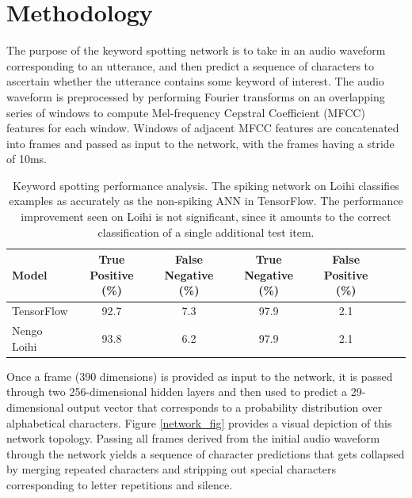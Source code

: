 \documentclass[sigconf, screen]{acmart}
\begin{document}
\section{Methodology}

The purpose of the keyword spotting network is to take in an audio waveform corresponding to an utterance, and then predict a sequence of characters to ascertain whether the utterance contains some keyword of interest. The audio waveform is preprocessed by performing Fourier transforms on an overlapping series of windows to compute Mel-frequency Cepstral Coefficient (MFCC) features for each window. Windows of adjacent MFCC features are concatenated into frames and passed as input to the network, with the frames having a stride of 10ms.  

\begin{table}[t!]
\caption{Keyword spotting performance analysis. The spiking network on Loihi classifies examples as accurately as the non-spiking ANN in TensorFlow. The performance improvement seen on Loihi is not significant, since it amounts to the correct classification of a single additional test item.}
\begin{center}
\begin{small}
\begin{sc}
\begin{tabular}{lcccccc}
\hline
Model & True Positive (\%) & False Negative (\%) & True Negative (\%) & False Positive (\%) \\
\hline
TensorFlow & 92.7 & 7.3 & 97.9 & 2.1 \\   
Nengo Loihi & 93.8 & 6.2 & 97.9 & 2.1 \\

\hline
\end{tabular}
\end{sc}
\end{small}
\end{center}
\label{acc-table}
\end{table}


Once a frame (390 dimensions) is provided as input to the network, it is passed through two 256-dimensional hidden layers and then used to predict a 29-dimensional output vector that corresponds to a probability distribution over alphabetical characters. Figure \ref{network_fig} provides a visual depiction of this network topology. Passing all frames derived from the initial audio waveform through the network yields a sequence of character predictions that gets collapsed by merging repeated characters and stripping out special characters corresponding to letter repetitions and silence. 
\end{document}
